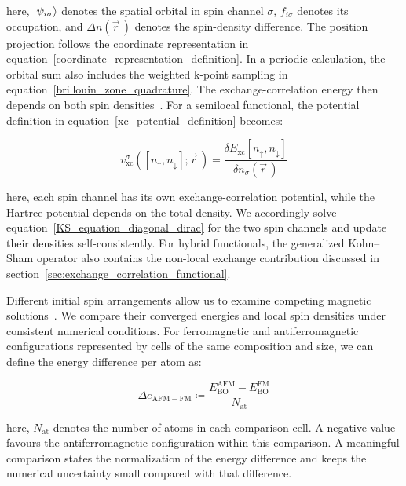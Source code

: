 here, $\ket{\psi_{i\sigma}}$ denotes the spatial orbital in spin channel $\sigma$,
$f_{i\sigma}$ denotes its occupation,
and $\Delta n(\vec{r}\,)$ denotes the spin-density difference.
The position projection follows the coordinate representation in equation~\eqref{coordinate_representation_definition}.
In a periodic calculation, the orbital sum also includes the weighted k-point sampling in equation~\eqref{brillouin_zone_quadrature}.
The exchange-correlation energy then depends on both spin densities~\cite{vonbarth1972local}.
For a semilocal functional, the potential definition in equation~\eqref{xc_potential_definition} becomes:

\begin{equation}
    v_\mathrm{xc}^{\sigma}([n_\uparrow,n_\downarrow];\vec{r}\,)
    =
    \frac{\delta E_\mathrm{xc}[n_\uparrow,n_\downarrow]}
    {\delta n_\sigma(\vec{r}\,)}
\label{spin_dependent_xc_potential_method}
\end{equation}

here, each spin channel has its own exchange-correlation potential,
while the Hartree potential depends on the total density.
We accordingly solve equation~\eqref{KS_equation_diagonal_dirac} for the two spin channels and update their densities self-consistently.
For hybrid functionals, the generalized Kohn--Sham operator also contains the non-local exchange contribution discussed in section~\ref{sec:exchange_correlation_functional}.

Different initial spin arrangements allow us to examine competing magnetic solutions~\cite{fakhera2026exploring,conquest2025investigation}.
We compare their converged energies and local spin densities under consistent numerical conditions.
For ferromagnetic and antiferromagnetic configurations represented by cells of the same composition and size,
we can define the energy difference per atom as:

\begin{equation}
    \Delta e_\mathrm{AFM-FM}
    \coloneqq
    \frac{E_\mathrm{BO}^\mathrm{AFM}-E_\mathrm{BO}^\mathrm{FM}}
    {N_\mathrm{at}}
\label{magnetic_energy_difference_method}
\end{equation}

here, $N_\mathrm{at}$ denotes the number of atoms in each comparison cell.
A negative value favours the antiferromagnetic configuration within this comparison.
A meaningful comparison states the normalization of the energy difference and keeps the numerical uncertainty small compared with that difference.

